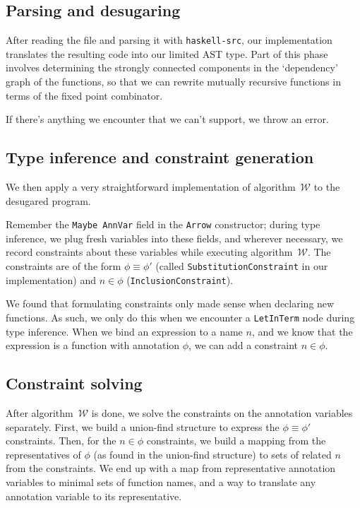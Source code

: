 \documentclass[a4paper]{scrartcl}
\newcommand{\algow}{algorithm~$\mathcal{W}$}
\begin{document}
\subsection{Parsing and desugaring}
After reading the file and parsing it with \texttt{haskell-src}, our
implementation translates the resulting code into our limited AST type.
Part of this phase involves determining the strongly connected components
in the `dependency' graph of the functions, so that we can rewrite mutually
recursive functions in terms of the fixed point combinator.

If there's anything we encounter that we can't support, we throw an error.

\subsection{Type inference and constraint generation}
We then apply a very straightforward implementation of \algow{} to the
desugared program.

Remember the \texttt{Maybe AnnVar} field in the \texttt{Arrow} constructor;
during type inference, we plug fresh variables into these fields, and wherever
necessary, we record constraints about these variables while executing \algow{}.
The constraints are of the form $\phi \equiv \phi'$ (called
\texttt{SubstitutionConstraint} in our implementation) and $n \in \phi$
(\texttt{InclusionConstraint}).

We found that formulating constraints only made sense when declaring new
functions. As such, we only do this when we encounter a \texttt{LetInTerm}
node during type inference. When we bind an expression to a name $n$,
and we know that the expression is a function with annotation $\phi$,
we can add a constraint $n \in \phi$.

\subsection{Constraint solving}
After \algow{} is done, we solve the constraints on the annotation variables
separately. First, we build a union-find structure to express the
$\phi \equiv \phi'$ constraints. Then, for the $n \in \phi$ constraints,
we build a mapping from the representatives of $\phi$ (as found in
the union-find structure) to sets of related $n$ from the constraints.
We end up with a map from representative annotation variables to minimal sets
of function names, and a way to translate any annotation variable to its
representative.
\end{document}
